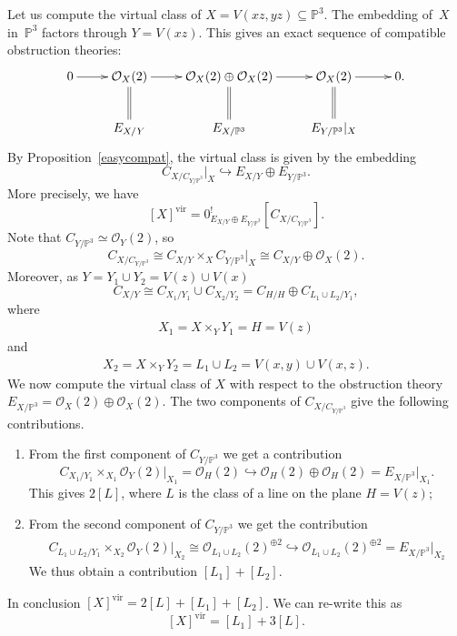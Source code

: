 \documentclass[pdftex]{sigma}
\numberwithin{equation}{section}
\newcommand{\vv}{\mathrm{vir}}
\newcommand{\OO}{\mathcal{O}}
\newcommand{\PP}{\mathbb P}
\theoremstyle{plain}
\theoremstyle{definition}
\theoremstyle{remark}
\begin{document}
\begin{Example}\label{mainexample}
Let us compute the virtual class of $X=V(xz,yz)\subseteq\PP^3$. The embedding of~$X$ in~$\PP^3$ factors through $Y=V(xz)$. This gives an exact sequence of compatible obstruction theories:
\[\xymatrix{0\ar[r] &\OO_X(2)\ar[r]\ar@{=}[d] &\OO_X(2)\oplus\OO_X(2)\ar[r]\ar@{=}[d] &\OO_X(2)\ar[r]\ar@{=}[d] &0.\\
& E_{X/Y} &E_{X/\PP^3} &E_{Y/\PP^3}\rvert_X}\]
By Proposition~\ref{easycompat}, the virtual class is given by the embedding
\[C_{X/C_{Y/\PP^3}}\rvert_X\hookrightarrow E_{X/Y}\oplus E_{Y/\PP^3}.\]
More precisely, we have
\[[X]^{\vv}=0^!_{E_{X/Y}\oplus E_{Y/\PP^3}}[C_{X/C_{Y/\PP^3}}].
\]
Note that $C_{Y/\PP^3}\simeq\OO_Y(2)$, so
\[
C_{X/C_{Y/\PP^3}}\cong C_{X/Y}\times_X C_{Y/\PP^3}\rvert_X \cong C_{X/Y}\oplus \OO_X(2).
\]
Moreover, as $Y=Y_1\cup Y_2=V(z)\cup V(x)$
\[C_{X/Y}\cong C_{X_1/Y_1} \cup C_{X_2/Y_2}=C_{H/H}\oplus C_{L_1\cup L_2/Y_1},\]
where \begin{gather*}X_1=X\times_Y Y_1=H=V(z)\end{gather*} and
\begin{gather*}X_2=X\times_Y Y_2=L_1\cup L_2=V(x,y)\cup V(x,z).\end{gather*}
We now compute the virtual class of $X$ with respect to the obstruction theory $E_{X/\PP^3}=\OO_X(2)\oplus \OO_X(2)$. The two components of $C_{X/C_{Y/\PP^3}}$ give the following contributions.
\begin{enumerate}\itemsep=0pt
\item From the first component of $C_{Y/\PP^3}$ we get a contribution
\[C_{X_1/Y_1}\times_{X_1}\OO_{Y}(2)\rvert_{X_1}=\OO_H(2)\hookrightarrow \OO_H(2)\oplus \OO_H(2)=E_{X/\PP^3}\rvert_{X_1} .\]
 This gives $2[L]$, where $L$ is the class of a line on the plane $H=V(z)$;
\item From the second component of $C_{Y/\PP^3}$ we get the contribution
\begin{align*}C_{L_1\cup L_2/Y_1}\times_{X_2}\OO_Y(2)\rvert_{X_2}\cong \OO_{L_1\cup L_2}(2)^{\oplus 2}\hookrightarrow \OO_{L_1\cup L_2}(2)^{\oplus 2} =E_{X/\PP^3}\rvert_{X_2}
\end{align*}
 We thus obtain a contribution $[L_1]+[L_2]$.
\end{enumerate}
In conclusion $[X]^{\vv}=2[L]+[L_1]+[L_2]$. We can re-write this as
\[[X]^{\vv}=[L_1]+3[L].\]
\end{Example}
\end{document}
